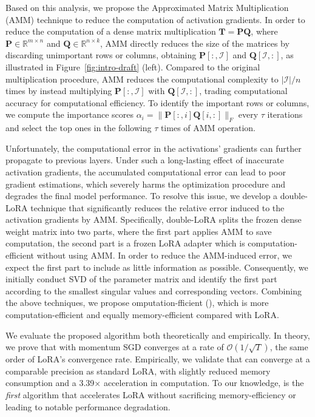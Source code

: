 Based on this analysis, we propose the Approximated Matrix Multiplication (AMM) technique to reduce the computation of activation gradients. In order to reduce the computation of a dense matrix multiplication $\mathbf{T}=\mathbf{P}\mathbf{Q}$, where $\mathbf{P}\in\mathbb{R}^{m\times n}$ and $\mathbf{Q}\in\mathbb{R}^{n\times k}$, AMM directly reduces the size of the matrices by discarding unimportant rows or columns, obtaining $\mathbf{P}[:,\mathcal{I}]$ and $\mathbf{Q}[\mathcal{I},:]$, as illustrated in Figure~\ref{fig:intro-draft} (left). Compared to the original multiplication procedure, AMM reduces the computational complexity to $|\mathcal{I}|/n$ times by instead multiplying $\mathbf{P}[:,\mathcal{I}]$ with $\mathbf{Q}[\mathcal{I},:]$, trading computational accuracy for computational efficiency. To identify the important rows or columns, we compute the importance scores $\alpha_i=\|\mathbf{P}[:,i]\mathbf{Q}[i,:]\|_F$ every $\tau$ iterations and select the top ones in the following $\tau$ times of AMM operation. 

Unfortunately, the computational error in the activations' gradients can further propagate to previous layers. Under such a long-lasting effect of inaccurate activation gradients, the  accumulated computational error can lead to poor gradient estimations, which severely harms the optimization procedure and degrades the final model performance. To resolve this issue, we develop a double-LoRA technique that significantly reduces the relative error induced to the activation gradients by AMM. Specifically, double-LoRA splits the frozen dense weight matrix into two parts, where the first part applies AMM to save computation, the second part is a frozen LoRA adapter which is computation-efficient without using AMM. In order to reduce the AMM-induced error, we expect the first part to include as little information as possible. Consequently, we initially conduct SVD of the parameter matrix and identify the first part according to the smallest singular values and corresponding vectors.
Combining the above techniques, we propose omputation-fficient  (\celora), which is more computation-efficient and equally memory-efficient compared with LoRA.

We evaluate the proposed \celora algorithm both theoretically and empirically. In theory, we prove that \celora with momentum SGD converges at a rate of $\mathcal{O}(1/\sqrt{T})$, the same order of LoRA's convergence rate. Empirically, we validate that \celora can converge at a comparable precision as standard LoRA, with slightly reduced memory consumption and a 3.39$\times$ acceleration in computation. To our knowledge, \celora is the \textit{first} algorithm that accelerates LoRA without sacrificing memory-efficiency or leading to notable performance degradation.

